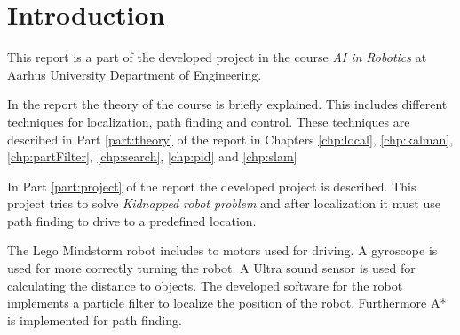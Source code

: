 \chapter{Introduction}
\label{chp:intro}

This report is a part of the developed project in the course \emph{AI in Robotics} at Aarhus University Department of Engineering.

In the report the theory of the course is briefly explained. This includes different techniques for localization, path finding and control. These techniques are described in Part \ref{part:theory} of the report in Chapters \ref{chp:local}, \ref{chp:kalman}, \ref{chp:partFilter}, \ref{chp:search}, \ref{chp:pid} and \ref{chp:slam}

In Part \ref{part:project} of the report the developed project is described. This project tries to solve \emph{Kidnapped robot problem} and after localization it must use path finding to drive to a predefined location.

The Lego Mindstorm robot includes to motors used for driving. A gyroscope is used for more correctly turning the robot. A Ultra sound sensor is used for calculating the distance to objects. The developed software for the robot implements a particle filter to localize the position of the robot. Furthermore A* is implemented for path finding.